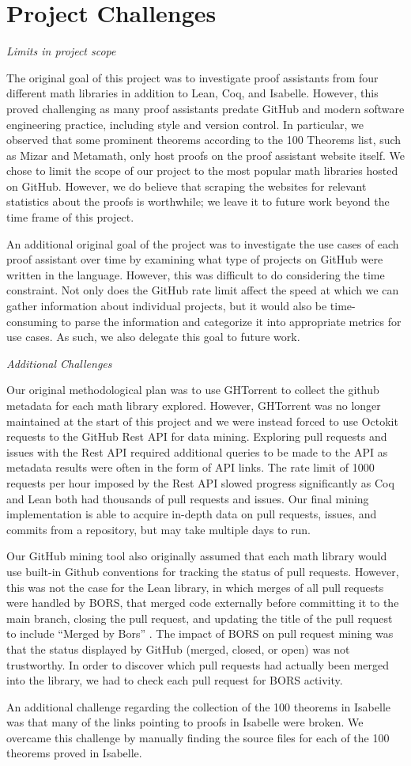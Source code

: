 \documentclass[sigconf,nonacm]{acmart}
\begin{document}
\section{Project Challenges}

\textit{Limits in project scope}

The original goal of this project was to investigate proof assistants from four different math libraries in addition to Lean, Coq, and Isabelle. However, this proved challenging as many proof assistants predate GitHub and modern software engineering practice, including style and version control. In particular, we observed that some prominent theorems according to the 100 Theorems list, such as Mizar and Metamath, only host proofs on the proof assistant website itself. We chose to limit the scope of our project to the most popular math libraries hosted on GitHub. However, we do believe that scraping the websites for relevant statistics about the proofs is worthwhile; we leave it to future work beyond the time frame of this project.

An additional original goal of the project was to investigate the use cases of each proof assistant over time by examining what type of projects on GitHub were written in the language. However, this was difficult to do considering the time constraint. Not only does the GitHub rate limit affect the speed at which we can gather information about individual projects, but it would also be time-consuming to parse the information and categorize it into appropriate metrics for use cases. As such, we also delegate this goal to future work.

\textit{Additional Challenges}

Our original methodological plan was to use GHTorrent to collect the github metadata for each math library explored. However, GHTorrent was no longer maintained at the start of this project and we were instead forced to use Octokit requests to the GitHub Rest API for data mining. Exploring pull requests and issues with the Rest API required additional queries to be made to the API as metadata results were often in the form of API links. The rate limit of 1000 requests per hour imposed by the Rest API slowed progress significantly as Coq and Lean both had thousands of pull requests and issues. Our final mining implementation is able to acquire in-depth data on pull requests, issues, and commits from a repository, but may take multiple days to run.

Our GitHub mining tool also originally assumed that each math library would use built-in Github conventions for tracking the status of pull requests. However, this was not the case for the Lean library, in which merges of all pull requests were handled by BORS, that merged code externally before committing it to the main branch, closing the pull request, and updating the title of the pull request to include “Merged by Bors” . The impact of BORS on pull request mining was that the status displayed by GitHub (merged, closed, or open) was not trustworthy. In order to discover which pull requests had actually been merged into the library, we had to check each pull request for BORS activity.

An additional challenge regarding the collection of the 100 theorems in Isabelle was that many of the links pointing to proofs in Isabelle were broken. We overcame this challenge by manually finding the source files for each of the 100 theorems proved in Isabelle.
\end{document}
